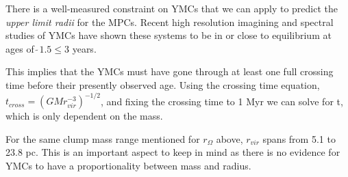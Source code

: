 There is a well-measured constraint on YMCs that we can apply to predict the \textit{upper limit radii} for the MPCs. Recent high resolution imagining and spectral studies of YMCs have shown these systems to be in or close to equilibrium at ages of  $\tilde~ 1.5 \leq 3$ years. \cite{Darwin_1900}

This implies that the YMCs must have gone through at least one full crossing time before their presently observed age. Using the crossing time equation, $t_{cross}=(GMr^{-3}_{vir})^{−1/2}$, and fixing the crossing time to 1 Myr we can solve for t, which is only dependent on the mass. \cite{1999}

For the same clump mass range mentioned for $r _{\Omega}$ above, $r _{vir}$ spans from 5.1 to 23.8 pc. This is an important aspect to keep in mind as there is no evidence for YMCs to have a proportionality between mass and radius. \cite{Bedini_2013}